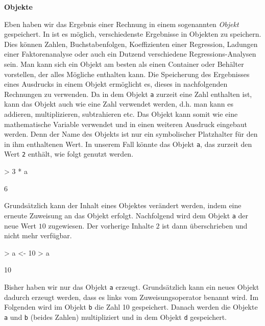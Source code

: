 \vspace{5mm}
\textbf{Objekte}

Eben haben wir das Ergebnis einer Rechnung in einem sogenannten \emph{Objekt} gespeichert. In \R{} ist es möglich, verschiedenste Ergebnisse in Objekten zu speichern. Dies können Zahlen, Buchstabenfolgen, Koeffizienten einer Regression, Ladungen einer Faktorenanalyse oder auch ein Dutzend verschiedene Regressions-Analysen sein. Man kann sich ein Objekt am besten als einen Container oder Behälter vorstellen, der alles Mögliche enthalten kann. Die Speicherung des Ergebnisses eines \R{} Ausdrucks in einem Objekt ermöglicht es, dieses in nachfolgenden Rechnungen zu verwenden. Da in dem Objekt \verb!a! zurzeit eine Zahl enthalten ist, kann das Objekt auch wie eine Zahl verwendet werden, d.h. man kann es addieren, multiplizieren, subtrahieren etc. Das Objekt kann somit wie eine mathematische Variable verwendet und in einen weiteren \R{} Ausdruck eingebaut werden. Denn der Name des Objekts ist nur ein symbolischer Platzhalter für den in ihm enthaltenen Wert. In unserem Fall könnte das Objekt \texttt{a}, das zurzeit den Wert \texttt{2} enthält, wie folgt genutzt werden.

\begin{Schunk}
\begin{Sinput}
> 3 * a
\end{Sinput}
\begin{Soutput}
[1] 6
\end{Soutput}
\end{Schunk}

Grundsätzlich kann der Inhalt eines Objektes verändert werden, indem eine erneute Zuweisung an das Objekt erfolgt. Nachfolgend wird dem Objekt \verb!a! der neue Wert $10$ zugewiesen. Der vorherige Inhalte $2$ ist dann überschrieben und nicht mehr verfügbar. 

\begin{Schunk}
\begin{Sinput}
> a <- 10
> a
\end{Sinput}
\begin{Soutput}
[1] 10
\end{Soutput}
\end{Schunk}

Bisher haben wir nur das Objekt \verb!a! erzeugt. Grundsätzlich kann ein neues Objekt dadurch erzeugt werden, dass es links vom Zuweisungsoperator benannt wird. Im Folgenden wird im Objekt \verb!b! die Zahl 10 gespeichert. Danach werden die Objekte \verb!a! und \verb!b! (beides Zahlen) multipliziert und in dem Objekt \verb!d! gespeichert.

